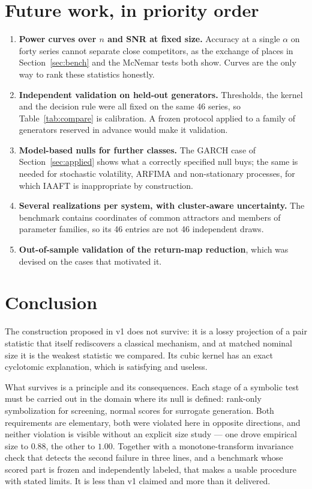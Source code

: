\documentclass[11pt]{article}
\begin{document}
\section{Future work, in priority order}

\begin{enumerate}[leftmargin=*,nosep]
\item \textbf{Power curves over $n$ and SNR at fixed size.} Accuracy at a
single $\alpha$ on forty series cannot separate close competitors, as the
exchange of places in Section~\ref{sec:bench} and the McNemar tests both show.
Curves are the only way to rank these statistics honestly.
\item \textbf{Independent validation on held-out generators.} Thresholds, the
kernel and the decision rule were all fixed on the same 46 series, so
Table~\ref{tab:compare} is calibration. A frozen protocol applied to a family
of generators reserved in advance would make it validation.
\item \textbf{Model-based nulls for further classes.} The GARCH case of
Section~\ref{sec:applied} shows what a correctly specified null buys; the same
is needed for stochastic volatility, ARFIMA and non-stationary processes, for
which IAAFT is inappropriate by construction.
\item \textbf{Several realizations per system, with cluster-aware
uncertainty.} The benchmark contains coordinates of common attractors and
members of parameter families, so its 46 entries are not 46 independent draws.
\item \textbf{Out-of-sample validation of the return-map reduction}, which was
devised on the cases that motivated it.
\end{enumerate}

\section{Conclusion}

The construction proposed in v1 does not survive: it is a lossy projection of a
pair statistic that itself rediscovers a classical mechanism, and at matched
nominal size it is the weakest statistic we compared. Its cubic kernel has an
exact cyclotomic explanation, which is satisfying and useless.

What survives is a principle and its consequences. Each stage of a symbolic test
must be carried out in the domain where its null is defined: rank-only
symbolization for screening, normal scores for surrogate generation. Both
requirements are elementary, both were violated here in opposite directions, and
neither violation is visible without an explicit size study --- one drove
empirical size to $0.88$, the other to $1.00$. Together with a monotone-transform
invariance check that detects the second failure in three lines, and a benchmark
whose scored part is frozen and independently labeled, that makes a usable
procedure with stated limits. It is less than v1 claimed and more than it
delivered.
\end{document}
